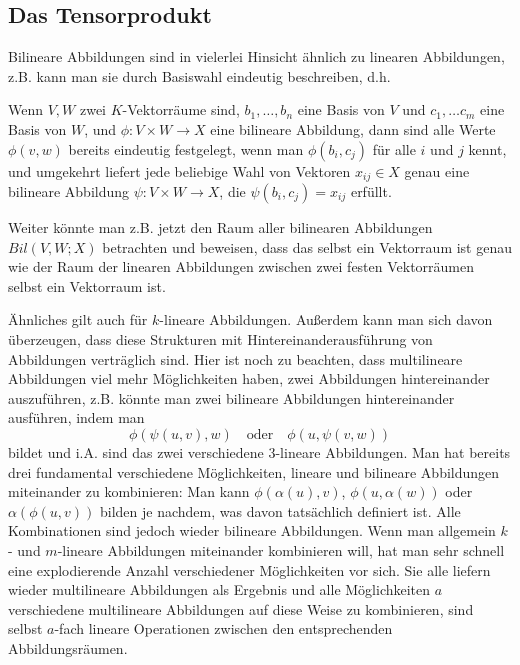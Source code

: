 
\subsection{Das Tensorprodukt}

\begin{remark}
Bilineare Abbildungen sind in vielerlei Hinsicht ähnlich zu linearen Abbildungen, z.B. kann man sie durch Basiswahl eindeutig beschreiben, d.h.

\medbreak
Wenn $V,W$ zwei $K$-Vektorräume sind, $b_1,\ldots,b_n$ eine Basis von $V$ und $c_1, \ldots c_m$ eine Basis von $W$, und $\phi: V\times W\to X$ eine bilineare Abbildung, dann sind alle Werte $\phi(v,w)$ bereits eindeutig festgelegt, wenn man $\phi(b_i,c_j)$ für alle $i$ und $j$ kennt, und umgekehrt liefert jede beliebige Wahl von Vektoren $x_{ij}\in X$ genau eine bilineare Abbildung $\psi: V\times W\to X$, die $\psi(b_i,c_j) = x_{ij}$ erfüllt.

\medbreak
Weiter könnte man z.B. jetzt den Raum aller bilinearen Abbildungen $Bil(V,W;X)$ betrachten und beweisen, dass das selbst ein Vektorraum ist genau wie der Raum der linearen Abbildungen zwischen zwei festen Vektorräumen selbst ein Vektorraum ist.

\medbreak
Ähnliches gilt auch für $k$-lineare Abbildungen. Außerdem kann man sich davon überzeugen, dass diese Strukturen mit Hintereinanderausführung von Abbildungen verträglich sind. Hier ist noch zu beachten, dass multilineare Abbildungen viel mehr Möglichkeiten haben, zwei Abbildungen hintereinander auszuführen, z.B. könnte man zwei bilineare Abbildungen hintereinander ausführen, indem man
\[\phi(\psi(u,v),w)\quad\text{oder}\quad \phi(u,\psi(v,w))\]
bildet und i.A. sind das zwei verschiedene $3$-lineare Abbildungen. Man hat bereits drei fundamental verschiedene Möglichkeiten, lineare und bilineare Abbildungen miteinander zu kombinieren: Man kann $\phi(\alpha(u),v)$, $\phi(u,\alpha(w))$ oder $\alpha(\phi(u,v))$ bilden je nachdem, was davon tatsächlich definiert ist. Alle Kombinationen sind jedoch wieder bilineare Abbildungen. Wenn man allgemein $k$- und $m$-lineare Abbildungen miteinander kombinieren will, hat man sehr schnell eine explodierende Anzahl verschiedener Möglichkeiten vor sich. Sie alle liefern wieder multilineare Abbildungen als Ergebnis und alle Möglichkeiten $a$ verschiedene multilineare Abbildungen auf diese Weise zu kombinieren, sind selbst $a$-fach lineare Operationen zwischen den entsprechenden Abbildungsräumen.


\end{remark}
